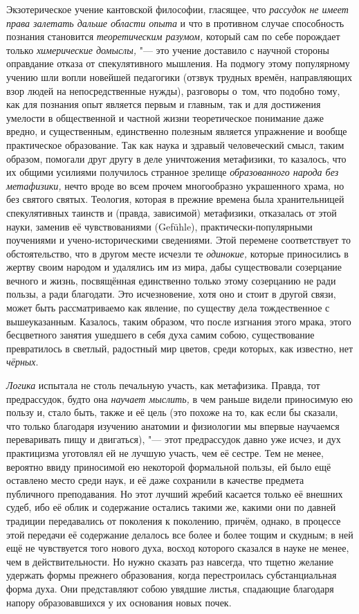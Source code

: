 \label{bkm:Ref474526580}Экзотерическое учение кантовской философии, гласящее,
что {\em рассудок не имеет права залетать дальше области опыта} и что в
противном случае способность познания становится {\em теоретическим разумом,}
который сам по себе порождает только {\em химерические домыслы,} "--- это
учение доставило с научной стороны оправдание отказа от спекулятивного
мышления. На подмогу этому популярному учению шли вопли новейшей педагогики
(отзвук трудных времён, направляющих взор людей на непосредственные нужды),
разговоры о~том, что подобно тому, как для познания опыт является первым и
главным, так и для достижения умелости в общественной и частной жизни
теоретическое понимание даже вредно, и существенным, единственно полезным
является упражнение и вообще практическое образование. Так как наука и здравый
человеческий смысл, таким образом, помогали друг другу в деле уничтожения
метафизики, то казалось, что их общими усилиями получилось странное зрелище
{\em образованного народа без метафизики,} нечто вроде во всем прочем
многообразно украшенного храма, но без святого святых. Теология, которая в
прежние времена была хранительницей спекулятивных таинств и (правда, зависимой)
метафизики, отказалась от этой науки, заменив её чувствованиями (Gefühle),
практически-популярными поучениями и учено-историческими сведениями. Этой
перемене соответствует то обстоятельство, что в другом месте исчезли те
{\em одинокие,} которые приносились в жертву своим народом и удалялись им из
мира, дабы существовали созерцание вечного и жизнь, посвящённая единственно
только этому созерцанию не ради пользы, а ради благодати. Это исчезновение,
хотя оно и стоит в другой связи, может быть рассматриваемо как явление, по
существу дела тождественное с вышеуказанным. Казалось, таким образом, что после
изгнания этого мрака, этого бесцветного занятия ушедшего в себя духа самим
собою, существование превратилось в светлый, радостный мир цветов, среди
которых, как известно, нет {\em чёрных}.

{\em Логика} испытала не столь печальную участь, как метафизика. Правда, тот
предрассудок, будто она {\em научает мыслить,} в чем раньше видели приносимую
ею пользу и, стало быть, также и её цель (это похоже на то, как если бы
сказали, что только благодаря изучению анатомии и физиологии мы впервые
научаемся переваривать пищу и двигаться), "--- этот предрассудок давно уже
исчез, и дух практицизма уготовлял ей не лучшую участь, чем её сестре. Тем не
менее, вероятно ввиду приносимой ею некоторой формальной пользы, ей было ещё
оставлено место среди наук, и её даже сохранили в качестве предмета публичного
преподавания. Но этот лучший жребий касается только её внешних судеб, ибо её
облик и содержание остались такими же, какими они по давней традиции
передавались от поколения к поколению, причём, однако, в процессе этой передачи
её содержание делалось все более и более тощим и скудным; в ней ещё не
чувствуется того нового духа, восход которого сказался в науке не менее, чем в
действительности. Но нужно сказать раз навсегда, что тщетно желание удержать
формы прежнего образования, когда перестроилась субстанциальная форма духа. Они
представляют собою увядшие листья, спадающие благодаря напору образовавшихся у
их основания новых почек.

